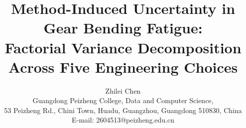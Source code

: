 \documentclass[12pt,a4paper]{article}
\begin{document}
\title{\textbf{Method-Induced Uncertainty in Gear Bending Fatigue:\\
Factorial Variance Decomposition Across Five Engineering Choices}}

\author{Zhilei Chen\\
Guangdong Peizheng College, Data and Computer Science,\\
53 Peizheng Rd., Chini Town, Huadu, Guangzhou, Guangdong 510830, China\\
E-mail: 2604513@peizheng.edu.cn}

\maketitle

\end{document}
